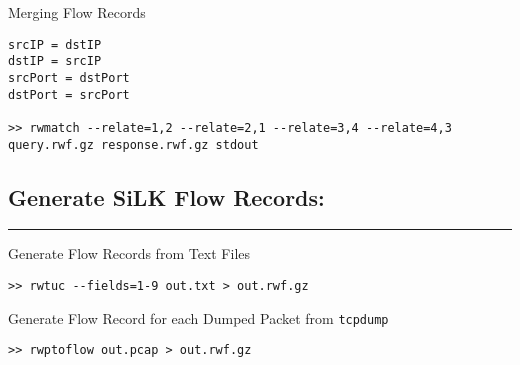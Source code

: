 Merging Flow Records

\begin{lstlisting}
srcIP = dstIP
dstIP = srcIP
srcPort = dstPort
dstPort = srcPort

>> rwmatch --relate=1,2 --relate=2,1 --relate=3,4 --relate=4,3 query.rwf.gz response.rwf.gz stdout
\end{lstlisting}

\subsection{Generate SiLK Flow Records:}

\begin{center}\rule{3in}{0.4pt}\end{center}

Generate Flow Records from Text Files

\begin{lstlisting}
>> rwtuc --fields=1-9 out.txt > out.rwf.gz
\end{lstlisting}

Generate Flow Record for each Dumped Packet from \lstinline!tcpdump!

\begin{lstlisting}
>> rwptoflow out.pcap > out.rwf.gz
\end{lstlisting}

